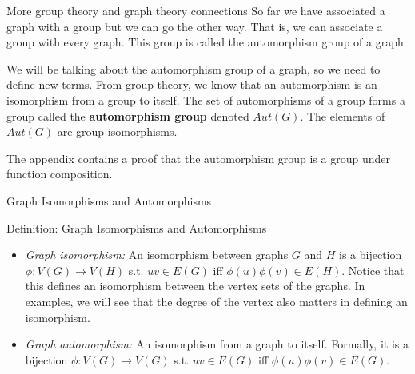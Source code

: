 \documentclass{beamer}
\begin{document}
\begin{frame}{More group theory and graph theory connections}
So far we have associated a graph with a group but we can go the other way. That is, we can associate a group with every graph. This group is called the automorphism group of a graph. \pause

We will be talking about the automorphism group of a graph, so we need to define new terms. From group theory, we know that an automorphism is an isomorphism from a group to itself. The set of automorphisms of a group forms a group called the \textbf{automorphism group} denoted $Aut(G)$. The elements of $Aut(G)$ are group isomorphisms. 

The appendix contains a proof that the automorphism group is a group under function composition.
\end{frame}

\begin{frame}{Graph Isomorphisms and Automorphisms}
\begin{block}{Definition: Graph Isomorphisms and Automorphisms}
\begin{itemize}
\item<1-> \textit{Graph isomorphism:} An isomorphism between graphs $G$ and $H$ is a bijection $\phi: V(G) \to V(H)$ s.t. $uv \in E(G)$ iff $\phi(u)\phi(v) \in E(H)$. Notice that this defines an isomorphism between the vertex sets of the graphs. In examples, we will see that the degree of the vertex also matters in defining an isomorphism.
\item<2-> \textit{Graph automorphism:} An isomorphism from a graph to itself. Formally, it is a bijection $\phi: V(G) \to V(G)$ s.t. $uv \in E(G)$ iff $\phi(u)\phi(v) \in E(G)$.
\end{itemize}
\end{block}
\end{frame}
\end{document}
